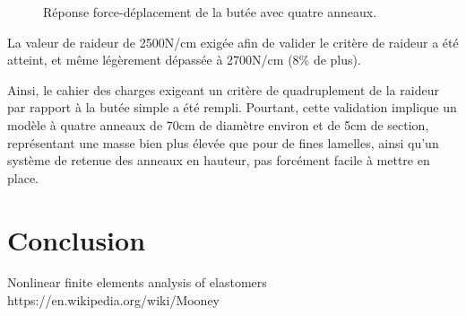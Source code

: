 ﻿\documentclass{article}
\begin{document}
\begin{figure}[!h]
	\centering
	\caption{Réponse force-déplacement de la butée avec quatre anneaux.}
	\label{fig36}
\end{figure}

La valeur de raideur de 2500N/cm exigée afin de valider le critère de raideur a été atteint, et même légèrement dépassée à 2700N/cm (8\% de plus).

Ainsi, le cahier des charges exigeant un critère de quadruplement de la raideur par rapport à la butée simple a été rempli. Pourtant, cette validation implique un modèle à quatre anneaux de 70cm de diamètre environ et de 5cm de section, représentant une masse bien plus élevée que pour de fines lamelles, ainsi qu'un système de retenue des anneaux en hauteur, pas forcément facile à mettre en place.


\section{Conclusion}

\listoffigures

\begin{thebibliography}{9}
 Nonlinear finite elements analysis of elastomers
 https://en.wikipedia.org/wiki/Mooney%
\end{thebibliography}
\end{document}
